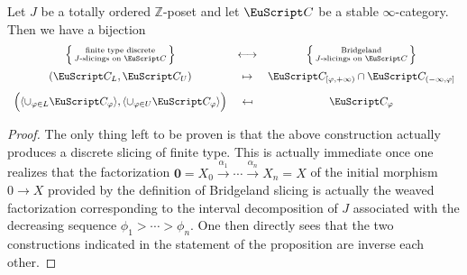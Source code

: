\begin{proposition}\label{b-is-discrete}
Let $J$ be a totally ordered $\mathbb{Z}$-poset and let $\C$ be a stable $\infty$-category. Then we have a bijection
\[
\begin{array}{ccc}
 \left\{
\begin{smallmatrix}
\text{finite type discrete}\\
\text{$J$-slicings on $\C$}
\end{smallmatrix}
\right\}
& \longleftrightarrow & 
\left\{
\begin{smallmatrix}
\text{Bridgeland}\\
\text{$J$-slicings on $\C$}
\end{smallmatrix}
\right\}\\[3mm]
(\C_L,\C_U)
& \mapsto & 
\C_{[\phi,+\infty)}\cap \C_{(-\infty,\phi]}\\[3mm]
\Big(\langle \cup_{\phi\in L}\C_\phi \rangle,\langle \cup_{\phi\in U}\C_\phi \rangle\Big)
& \mapsfrom &
\C_\varphi
\end{array}
\]
\end{proposition}
\begin{proof}
The only thing left to be proven is that the above construction actually produces a discrete slicing of finite type. This is actually immediate once one realizes that the factorization  $\mathbf{0}=X_0 \xrightarrow{\alpha_1} \cdots \xrightarrow{\alpha_n} X_n=X$ of the initial morphism $0\to X$ provided by the definition of Bridgeland slicing is actually the weaved factorization corresponding to the interval decomposition of $J$ associated with the decreasing sequence $\phi_1 > \cdots > \phi_n$. One then directly sees that the two constructions indicated in the statement of the proposition are inverse each other.
\end{proof}

